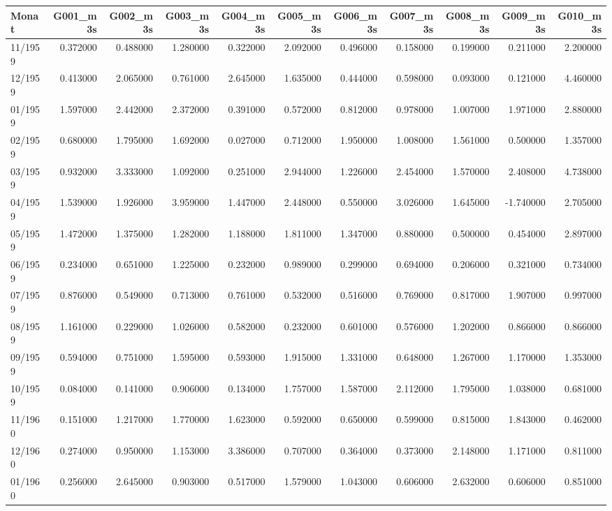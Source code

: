\begin{tabular}{lrrrrrrrrrr}
\toprule
Monat & G001_m3s & G002_m3s & G003_m3s & G004_m3s & G005_m3s & G006_m3s & G007_m3s & G008_m3s & G009_m3s & G010_m3s \\
\midrule
11/1959 & 0.372000 & 0.488000 & 1.280000 & 0.322000 & 2.092000 & 0.496000 & 0.158000 & 0.199000 & 0.211000 & 2.200000 \\
12/1959 & 0.413000 & 2.065000 & 0.761000 & 2.645000 & 1.635000 & 0.444000 & 0.598000 & 0.093000 & 0.121000 & 4.460000 \\
01/1959 & 1.597000 & 2.442000 & 2.372000 & 0.391000 & 0.572000 & 0.812000 & 0.978000 & 1.007000 & 1.971000 & 2.880000 \\
02/1959 & 0.680000 & 1.795000 & 1.692000 & 0.027000 & 0.712000 & 1.950000 & 1.008000 & 1.561000 & 0.500000 & 1.357000 \\
03/1959 & 0.932000 & 3.333000 & 1.092000 & 0.251000 & 2.944000 & 1.226000 & 2.454000 & 1.570000 & 2.408000 & 4.738000 \\
04/1959 & 1.539000 & 1.926000 & 3.959000 & 1.447000 & 2.448000 & 0.550000 & 3.026000 & 1.645000 & -1.740000 & 2.705000 \\
05/1959 & 1.472000 & 1.375000 & 1.282000 & 1.188000 & 1.811000 & 1.347000 & 0.880000 & 0.500000 & 0.454000 & 2.897000 \\
06/1959 & 0.234000 & 0.651000 & 1.225000 & 0.232000 & 0.989000 & 0.299000 & 0.694000 & 0.206000 & 0.321000 & 0.734000 \\
07/1959 & 0.876000 & 0.549000 & 0.713000 & 0.761000 & 0.532000 & 0.516000 & 0.769000 & 0.817000 & 1.907000 & 0.997000 \\
08/1959 & 1.161000 & 0.229000 & 1.026000 & 0.582000 & 0.232000 & 0.601000 & 0.576000 & 1.202000 & 0.866000 & 0.866000 \\
09/1959 & 0.594000 & 0.751000 & 1.595000 & 0.593000 & 1.915000 & 1.331000 & 0.648000 & 1.267000 & 1.170000 & 1.353000 \\
10/1959 & 0.084000 & 0.141000 & 0.906000 & 0.134000 & 1.757000 & 1.587000 & 2.112000 & 1.795000 & 1.038000 & 0.681000 \\
11/1960 & 0.151000 & 1.217000 & 1.770000 & 1.623000 & 0.592000 & 0.650000 & 0.599000 & 0.815000 & 1.843000 & 0.462000 \\
12/1960 & 0.274000 & 0.950000 & 1.153000 & 3.386000 & 0.707000 & 0.364000 & 0.373000 & 2.148000 & 1.171000 & 0.811000 \\
01/1960 & 0.256000 & 2.645000 & 0.903000 & 0.517000 & 1.579000 & 1.043000 & 0.606000 & 2.632000 & 0.606000 & 0.851000 \\

\end{tabular}
